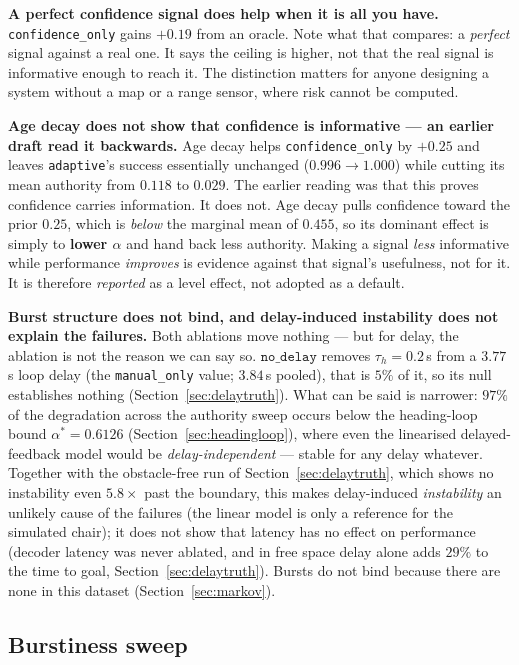 \documentclass[11pt,a4paper]{article}
\newcommand{\vmanual}{\texttt{manual\_only}}
\newcommand{\vconf}{\texttt{confidence\_only}}
\newcommand{\vadapt}{\texttt{adaptive}}
\newcommand{\astar}{\alpha^{*}}
\theoremstyle{plain}
\theoremstyle{definition}
\begin{document}
\textbf{A perfect confidence signal does help when it is all you have.}
\vconf{} gains $+0.19$ from an oracle. Note what that compares: a
\emph{perfect} signal against a real one. It says the ceiling is higher,
not that the real signal is informative enough to reach it. The
distinction matters for anyone designing a system without a map or a
range sensor, where risk cannot be computed.

\textbf{Age decay does not show that confidence is informative --- an
earlier draft read it backwards.} Age decay helps \vconf{} by $+0.25$
and leaves \vadapt{}'s success essentially unchanged ($0.996 \to 1.000$)
while cutting its mean authority
from $0.118$ to $0.029$. The earlier reading was that this proves
confidence carries information. It does not. Age decay pulls confidence
toward the prior $0.25$, which is \emph{below} the marginal mean of
$0.455$, so its dominant effect is simply to \textbf{lower $\alpha$} and
hand back less authority. Making a signal \emph{less} informative while
performance \emph{improves} is evidence against that signal's
usefulness, not for it. It is therefore \emph{reported} as a level
effect, not adopted as a default.

\textbf{Burst structure does not bind, and delay-induced instability
does not explain the failures.} Both ablations move nothing --- but for
delay, the ablation is not the reason we can say so.
$\texttt{no\_delay}$ removes $\tau_h = 0.2$\,s from a $3.77$\,s loop
delay (the \vmanual{} value; $3.84$\,s pooled), that is $5\%$ of it, so
its null establishes nothing
(Section~\ref{sec:delaytruth}). What can be said is narrower: $97\%$ of
the degradation across the authority sweep occurs below the heading-loop
bound $\astar = 0.6126$ (Section~\ref{sec:headingloop}), where even the
linearised delayed-feedback model would be \emph{delay-independent}
--- stable for any delay whatever. Together with the obstacle-free run of
Section~\ref{sec:delaytruth}, which shows no instability even $5.8\times$
past the boundary, this makes delay-induced \emph{instability} an
unlikely cause of the failures (the linear model is only a reference for
the simulated chair); it does not show that
latency has no effect on performance (decoder latency was never
ablated, and in free space delay alone adds $29\%$ to the time to goal,
Section~\ref{sec:delaytruth}). Bursts do not bind because there are
none in this dataset (Section~\ref{sec:markov}).

\subsection{Burstiness sweep}
\label{sec:burstresults}
\end{document}
